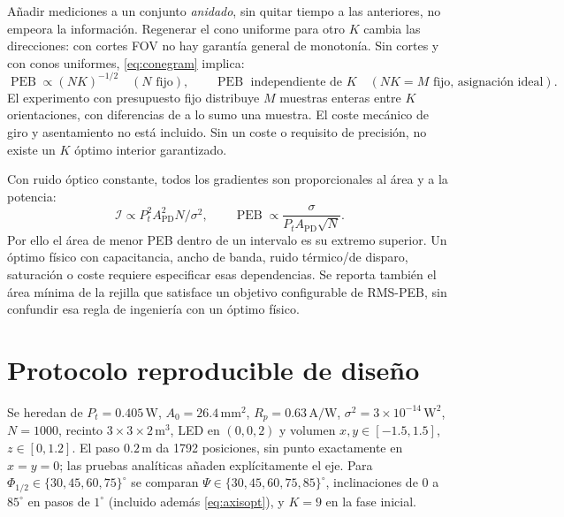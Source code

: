 \documentclass[11pt,a4paper]{article}
\newcommand{\PEB}{\operatorname{PEB}}
\begin{document}
Añadir mediciones a un conjunto \emph{anidado}, sin quitar tiempo a las anteriores, no empeora la información. Regenerar el cono uniforme para otro $K$ cambia las direcciones: con cortes FOV no hay garantía general de monotonía. Sin cortes y con conos uniformes, \eqref{eq:conegram} implica:
\begin{equation}
\PEB\propto (NK)^{-1/2}\quad(N\text{ fijo}),\qquad
\PEB\text{ independiente de }K\quad(NK=M\text{ fijo, asignación ideal}).
\label{eq:Kscaling}
\end{equation}
El experimento con presupuesto fijo distribuye $M$ muestras enteras entre $K$ orientaciones, con diferencias de a lo sumo una muestra. El coste mecánico de giro y asentamiento no está incluido. Sin un coste o requisito de precisión, no existe un $K$ óptimo interior garantizado.

Con ruido óptico constante, todos los gradientes son proporcionales al área y a la potencia:
\begin{equation}
\mathcal I\propto P_t^2 A_{\mathrm{PD}}^2 N/\sigma^2,\qquad
\PEB\propto\frac{\sigma}{P_t A_{\mathrm{PD}}\sqrt N}.
\label{eq:area}
\end{equation}
Por ello el área de menor PEB dentro de un intervalo es su extremo superior. Un óptimo físico con capacitancia, ancho de banda, ruido térmico/de disparo, saturación o coste requiere especificar esas dependencias. Se reporta también el área mínima de la rejilla que satisface un objetivo configurable de RMS-PEB, sin confundir esa regla de ingeniería con un óptimo físico.

\section{Protocolo reproducible de diseño}
Se heredan de \cite{broadcast} $P_t=0.405\,\mathrm W$, $A_0=26.4\,\mathrm{mm}^2$, $R_p=0.63\,\mathrm{A/W}$, $\sigma^2=3\times10^{-14}\,\mathrm W^2$, $N=1000$, recinto $3\times3\times2\,\mathrm m^3$, LED en $(0,0,2)$ y volumen $x,y\in[-1.5,1.5]$, $z\in[0,1.2]$. El paso $0.2\,\mathrm m$ da 1792 posiciones, sin punto exactamente en $x=y=0$; las pruebas analíticas añaden explícitamente el eje. Para $\Phi_{1/2}\in\{30,45,60,75\}^\circ$ se comparan $\Psi\in\{30,45,60,75,85\}^\circ$, inclinaciones de $0$ a $85^\circ$ en pasos de $1^\circ$ (incluido además \eqref{eq:axisopt}), y $K=9$ en la fase inicial.
\end{document}
